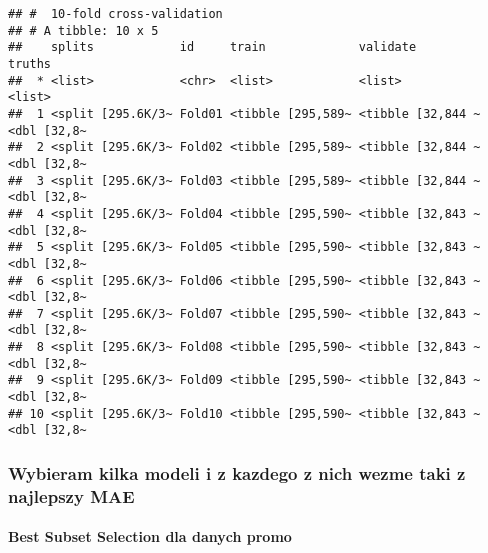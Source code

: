 \documentclass[]{article}
\newenvironment{Shaded}{\begin{snugshade}}{\end{snugshade}}
\newcommand{\DataTypeTok}[1]{\textcolor[rgb]{0.13,0.29,0.53}{#1}}
\newcommand{\DecValTok}[1]{\textcolor[rgb]{0.00,0.00,0.81}{#1}}
\newcommand{\KeywordTok}[1]{\textcolor[rgb]{0.13,0.29,0.53}{\textbf{#1}}}
\newcommand{\NormalTok}[1]{#1}
\newcommand{\OperatorTok}[1]{\textcolor[rgb]{0.81,0.36,0.00}{\textbf{#1}}}
\newcommand{\StringTok}[1]{\textcolor[rgb]{0.31,0.60,0.02}{#1}}
\let\oldparagraph\paragraph
\renewcommand{\paragraph}[1]{\oldparagraph{#1}\mbox{}}
\begin{document}
\begin{Shaded}
\end{Shaded}

\begin{verbatim}
## #  10-fold cross-validation 
## # A tibble: 10 x 5
##    splits            id     train             validate          truths     
##  * <list>            <chr>  <list>            <list>            <list>     
##  1 <split [295.6K/3~ Fold01 <tibble [295,589~ <tibble [32,844 ~ <dbl [32,8~
##  2 <split [295.6K/3~ Fold02 <tibble [295,589~ <tibble [32,844 ~ <dbl [32,8~
##  3 <split [295.6K/3~ Fold03 <tibble [295,589~ <tibble [32,844 ~ <dbl [32,8~
##  4 <split [295.6K/3~ Fold04 <tibble [295,590~ <tibble [32,843 ~ <dbl [32,8~
##  5 <split [295.6K/3~ Fold05 <tibble [295,590~ <tibble [32,843 ~ <dbl [32,8~
##  6 <split [295.6K/3~ Fold06 <tibble [295,590~ <tibble [32,843 ~ <dbl [32,8~
##  7 <split [295.6K/3~ Fold07 <tibble [295,590~ <tibble [32,843 ~ <dbl [32,8~
##  8 <split [295.6K/3~ Fold08 <tibble [295,590~ <tibble [32,843 ~ <dbl [32,8~
##  9 <split [295.6K/3~ Fold09 <tibble [295,590~ <tibble [32,843 ~ <dbl [32,8~
## 10 <split [295.6K/3~ Fold10 <tibble [295,590~ <tibble [32,843 ~ <dbl [32,8~
\end{verbatim}

\hypertarget{wybieram-kilka-modeli-i-z-kazdego-z-nich-wezme-taki-z-najlepszy-mae-1}{%
\subsubsection{Wybieram kilka modeli i z kazdego z nich wezme taki z
najlepszy
MAE}\label{wybieram-kilka-modeli-i-z-kazdego-z-nich-wezme-taki-z-najlepszy-mae-1}}

\hypertarget{best-subset-selection-dla-danych-promo}{%
\paragraph{Best Subset Selection dla danych
promo}\label{best-subset-selection-dla-danych-promo}}
\end{document}
